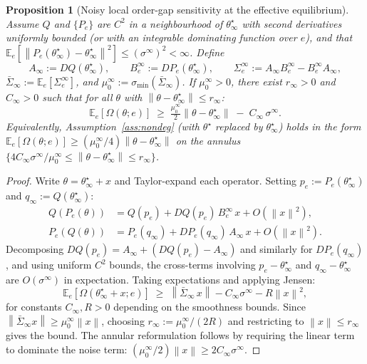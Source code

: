 \documentclass[12pt,a4paper]{article}
\newtheorem{proposition}[definition]{Proposition}
\newcommand{\norm}[1]{\left\lVert#1\right\rVert}
\newcommand{\Ogap}{\Omega}
\begin{document}
\begin{proposition}[Noisy local order-gap sensitivity at the effective equilibrium]
\label{prop:noisy_nondeg}
Assume $Q$ and $\{P_e\}$ are $C^2$ in a neighbourhood of
$\theta^\star_\infty$ with second derivatives uniformly bounded (or with an
integrable dominating function over $e$), and that
$\mathbb{E}_e[\norm{P_e(\theta^\star_\infty) - \theta^\star_\infty}^2] \leq
(\sigma^\infty)^2 < \infty$. Define
\[
  A_\infty := DQ(\theta^\star_\infty), \qquad
  B_e^\infty := DP_e(\theta^\star_\infty), \qquad
  \Sigma_e^\infty := A_\infty B_e^\infty - B_e^\infty A_\infty,
\]
$\bar\Sigma_\infty := \mathbb{E}_e[\Sigma_e^\infty]$, and
$\mu_0^\infty := \sigma_{\min}(\bar\Sigma_\infty)$. If $\mu_0^\infty > 0$,
there exist $r_\infty > 0$ and $C_\infty > 0$ such that for all $\theta$ with
$\norm{\theta - \theta^\star_\infty} \leq r_\infty$:
\[
  \mathbb{E}_e[\Ogap(\theta; e)]
  \;\geq\; \tfrac{\mu_0^\infty}{2} \norm{\theta - \theta^\star_\infty}
  \;-\; C_\infty\, \sigma^\infty.
\]
Equivalently, Assumption~\ref{ass:nondeg} (with $\theta^\star$ replaced by
$\theta^\star_\infty$) holds in the form
$\mathbb{E}_e[\Ogap(\theta;e)] \geq (\mu_0^\infty/4)\norm{\theta -
\theta^\star_\infty}$ on the annulus
$\{4 C_\infty \sigma^\infty/\mu_0^\infty \leq \norm{\theta -
\theta^\star_\infty} \leq r_\infty\}$.
\end{proposition}

\begin{proof}
Write $\theta = \theta^\star_\infty + x$ and Taylor-expand each operator.
Setting $p_e := P_e(\theta^\star_\infty)$ and $q_\infty := Q(\theta^\star_\infty)$:
\begin{align*}
Q(P_e(\theta)) &= Q(p_e) + DQ(p_e)\,B_e^\infty\, x + O(\norm{x}^2),\\
P_e(Q(\theta)) &= P_e(q_\infty) + DP_e(q_\infty)\,A_\infty\, x + O(\norm{x}^2).
\end{align*}
Decomposing $DQ(p_e) = A_\infty + (DQ(p_e) - A_\infty)$ and similarly for
$DP_e(q_\infty)$, and using uniform $C^2$ bounds, the cross-terms involving
$p_e - \theta^\star_\infty$ and $q_\infty - \theta^\star_\infty$ are
$O(\sigma^\infty)$ in expectation. Taking expectations and applying Jensen:
\[
  \mathbb{E}_e[\Ogap(\theta^\star_\infty + x; e)]
  \;\geq\; \norm{\bar\Sigma_\infty\, x} - C_\infty \sigma^\infty - R\norm{x}^2,
\]
for constants $C_\infty, R > 0$ depending on the smoothness bounds. Since
$\norm{\bar\Sigma_\infty x} \geq \mu_0^\infty \norm{x}$, choosing
$r_\infty := \mu_0^\infty/(2R)$ and restricting to $\norm{x} \leq r_\infty$
gives the bound. The annular reformulation follows by requiring the linear
term to dominate the noise term: $(\mu_0^\infty/2)\norm{x} \geq 2C_\infty
\sigma^\infty$. \qedhere
\end{proof}
\end{document}
